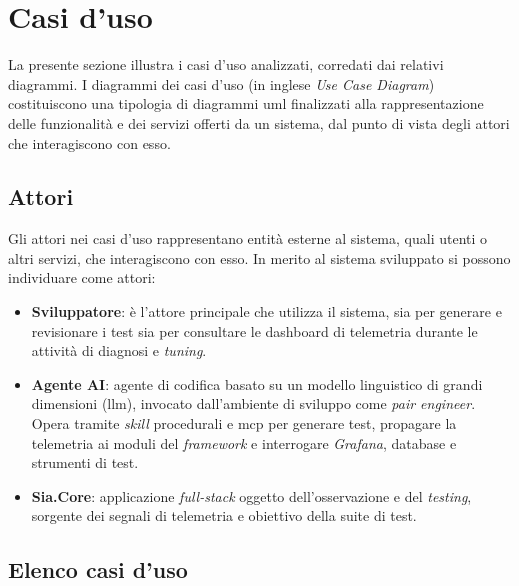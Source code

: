 \section{Casi d'uso}
La presente sezione illustra i casi d’uso analizzati, corredati dai relativi diagrammi.
I diagrammi dei casi d’uso (in inglese \emph{Use Case Diagram}) costituiscono una tipologia di diagrammi \gls{uml} finalizzati alla rappresentazione delle funzionalità e dei servizi offerti da un sistema, dal punto di vista degli attori che interagiscono con esso.

\subsection{Attori}
Gli attori nei casi d’uso rappresentano entità esterne al sistema, quali utenti o altri servizi, che interagiscono con esso.
In merito al sistema sviluppato si possono individuare come attori:
\begin{itemize}
  \item \textbf{Sviluppatore}: è l'attore principale che utilizza il sistema, sia per generare e revisionare i test sia per consultare le dashboard di telemetria durante le attività di diagnosi e \emph{tuning}.
  \item \textbf{Agente AI}: agente di codifica basato su un modello linguistico di grandi dimensioni (\gls{llm}), invocato dall'ambiente di sviluppo come \emph{pair engineer}. Opera tramite \emph{skill} procedurali e \gls{mcp} per generare test, propagare la telemetria ai moduli del \emph{framework} e interrogare \emph{Grafana}, database e strumenti di test.
  \item \textbf{Sia.Core}: applicazione \emph{full-stack} oggetto dell'osservazione e del \emph{testing}, sorgente dei segnali di telemetria e obiettivo della suite di test.
\end{itemize}

\subsection{Elenco casi d'uso}


